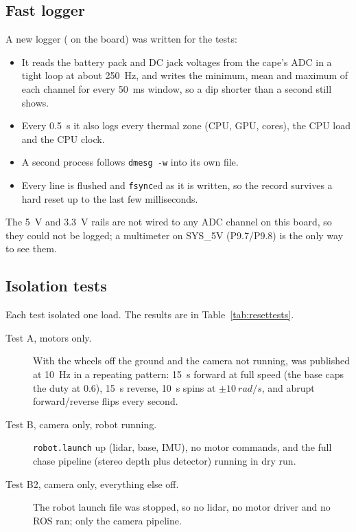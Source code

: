 \subsection{Fast logger}
\label{sec:fastlog}

A new logger ( on the board) was written for
the tests:
\begin{itemize}
\item It reads the battery pack and DC jack voltages from the cape's ADC in
  a tight loop at about \SI{250}{Hz}, and writes the minimum, mean and
  maximum of each channel for every \SI{50}{ms} window, so a dip shorter than
  a second still shows.
\item Every \SI{0.5}{s} it also logs every thermal zone (CPU, GPU, cores),
  the CPU load and the CPU clock.
\item A second process follows \texttt{dmesg -w} into its own file.
\item Every line is flushed and \texttt{fsync}ed as it is written, so the
  record survives a hard reset up to the last few milliseconds.
\end{itemize}
The \SI{5}{V} and \SI{3.3}{V} rails are not wired to any ADC channel on this
board, so they could not be logged; a multimeter on SYS\_5V (P9.7/P9.8) is
the only way to see them.

\subsection{Isolation tests}

Each test isolated one load. The results are in
Table~\ref{tab:resettests}.
\begin{description}
\item[Test A, motors only.] With the wheels off the ground and the camera
  not running,  was published at \SI{10}{Hz} in a repeating
  pattern: \SI{15}{s} forward at full speed (the base caps the duty at 0.6),
  \SI{15}{s} reverse, \SI{10}{s} spins at $\pm\SI{10}{rad/s}$, and abrupt
  forward/reverse flips every second.
\item[Test B, camera only, robot running.] \texttt{robot.launch} up (lidar,
  base, IMU), no motor commands, and the full chase pipeline (stereo depth
  plus detector) running in dry run.
\item[Test B2, camera only, everything else off.] The robot launch file was
  stopped, so no lidar, no motor driver and no ROS ran; only the camera
  pipeline.
\end{description}

